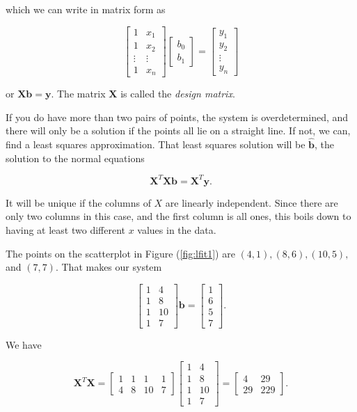 \documentclass[
]{book}
\theoremstyle{definition}
\theoremstyle{definition}
\theoremstyle{definition}
\theoremstyle{definition}
\theoremstyle{remark}
\begin{document}
which we can write in matrix form as

\[\begin{bmatrix}1 & x_1\\1 & x_2\\\vdots & \vdots\\1 & x_n\end{bmatrix}\begin{bmatrix}b_0\\b_1\end{bmatrix}=\begin{bmatrix}y_1\\y_2\\\vdots\\y_n\end{bmatrix}\]

or \(\mathbf{X}\mathbf{b}=\mathbf{y}\). The matrix \(\mathbf{X}\) is called the \emph{design matrix}.

If you do have more than two pairs of points, the system is overdetermined, and there will only be a solution if the points all lie on a straight line. If not, we can, find a least squares approximation. That least squares solution will be \(\hat{\mathbf{b}}\), the solution to the normal equations

\[\mathbf{X}^T\mathbf{X}\mathbf{b}=\mathbf{X}^T\mathbf{y}.\]

It will be unique if the columns of \(X\) are linearly independent. Since there are only two columns in this case, and the first column is all ones, this boils down to having at least two different \(x\) values in the data.

The points on the scatterplot in Figure (\ref{fig:lfit1}) are \((4,1),(8,6),(10,5),\) and \((7,7)\). That makes our system

\[\begin{bmatrix}1 & 4\\1 & 8\\1 & 10\\1 & 7\end{bmatrix}\mathbf{b}=\begin{bmatrix}1\\6\\5\\7\end{bmatrix}.\]

We have

\[\mathbf{X}^T\mathbf{X}=\begin{bmatrix}1 & 1 & 1 & 1\\4 & 8 & 10 & 7\end{bmatrix}\begin{bmatrix}1 & 4\\1 & 8\\1 & 10\\1 & 7\end{bmatrix}=\begin{bmatrix}4 & 29\\29 & 229\end{bmatrix}.\]
\end{document}

